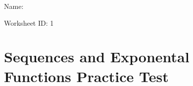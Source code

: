 \documentclass[12pt]{article}
\begin{document}

\begin{flushright}
Name: \underline{\hspace{2.5 in}}
\end{flushright}
\begin{flushright}
Worksheet ID: 1
\end{flushright}
\section*{Sequences and Exponental Functions Practice Test}
\end{document}
